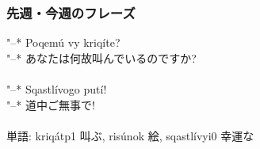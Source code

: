 \documentclass[uplatex,11pt]{jsarticle}
\begin{document}
\subsubsection*{先週・今週のフレーズ}
\noindent
"--* Poqem\'u vy kriq\'ite? \\
"--* あなたは何故叫んでいるのですか? \\
\\
"--* Sqastl\'ivogo put\'i! \\
"--* 道中ご無事で! \\
\\
単語: kriq\'at{p1} 叫ぶ, ris\'unok 絵, sqastl\'ivy{i0} 幸運な
\end{document}
